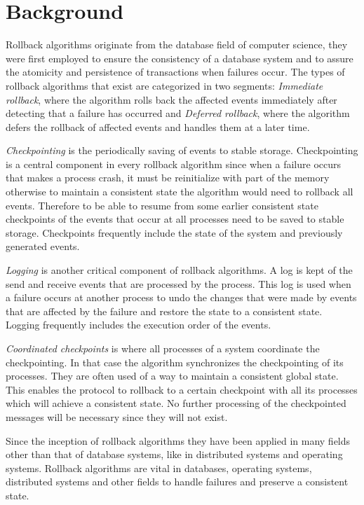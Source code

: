 \documentclass[twocolumn, a4paper,11pt]{article}%
\begin{document}
\section{Background}
\par Rollback algorithms originate from the database field of computer science, they were first employed to ensure the consistency of a database system and to assure the atomicity and persistence of transactions when failures occur. The types of rollback algorithms that exist are categorized in two segments: \textit{Immediate rollback}, where the algorithm rolls back the affected events  immediately after detecting that a failure has occurred  and \textit{Deferred rollback}, where the algorithm defers the rollback of affected events  and handles them at a later time. 
\par \textit{Checkpointing} is the periodically saving of events to stable storage. Checkpointing is a central component in every rollback algorithm since when a failure occurs that makes a process crash, it must  be reinitialize with part of the memory otherwise to maintain a consistent state the algorithm would need to rollback all events. Therefore to be able to resume from some earlier consistent state checkpoints of the events that occur at all processes need to be saved to stable storage. Checkpoints frequently include the state of the system and previously generated events.
\par \textit{Logging} is another critical component of rollback algorithms. A log is kept of the send and receive events that are processed by the process. This log is used when a failure occurs at another process to undo the changes that were made by events that are affected by the failure and restore the state to a consistent state. Logging frequently includes the execution order of the events. 
\par \textit{Coordinated checkpoints} is where all processes of a system coordinate the checkpointing. In that case the algorithm synchronizes the checkpointing of its processes. They are often used of a way to maintain a consistent global state. This enables the protocol to rollback to a certain checkpoint with all its processes which will achieve a consistent state. No further  processing of the checkpointed messages will be necessary since they will not exist.
\par  Since the inception of rollback algorithms they have been applied in many fields other than that of database systems, like in distributed systems and operating systems. Rollback algorithms are vital in databases, operating systems, distributed systems and other fields to handle failures and preserve a consistent state.
\end{document}
